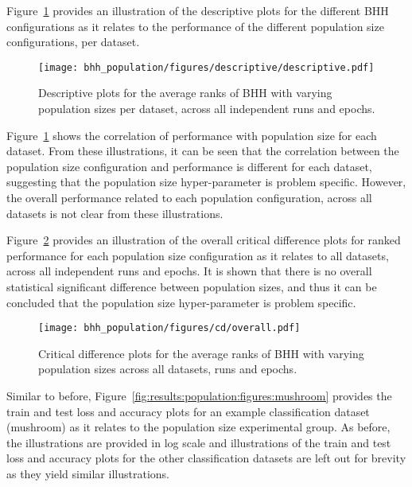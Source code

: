 Figure~\ref{fig:results:population:descriptive:descriptive} provides an illustration of the descriptive plots for the different \acs{BHH} configurations as it relates to the performance of the different population size configurations, per dataset.

\begin{figure}[htb]
      \centering
      \texttt{[image: bhh\_population/figures/descriptive/descriptive.pdf]}
      \caption{Descriptive plots for the average ranks of \acs{BHH} with varying population sizes per dataset, across all independent runs and epochs.}
      \label{fig:results:population:descriptive:descriptive}
\end{figure}

Figure~\ref{fig:results:population:descriptive:descriptive} shows the correlation of performance with population size for each dataset. From these illustrations, it can be seen that the correlation between the population size configuration and performance is different for each dataset, suggesting that the population size hyper-parameter is problem specific. However, the overall performance related to each population configuration, across all datasets is not clear from these illustrations.

Figure~\ref{fig:results:population:descriptive:cd} provides an illustration of the overall critical difference plots for ranked performance for each population size configuration as it relates to all datasets, across all independent runs and epochs. It is shown that there is no overall statistical significant difference between population sizes, and thus it can be concluded that the population size hyper-parameter is problem specific.

\begin{figure}[htb]
      \centering
      \texttt{[image: bhh\_population/figures/cd/overall.pdf]}
      \caption{Critical difference plots for the average ranks of \acs{BHH} with varying population sizes across all datasets, runs and epochs.}
      \label{fig:results:population:descriptive:cd}
\end{figure}

Similar to before, Figure~\ref{fig:results:population:figures:mushroom} provides the train and test loss and accuracy plots for an example classification dataset (mushroom) as it relates to the population size experimental group. As before, the illustrations are provided in log scale and illustrations of the train and test loss and accuracy plots for the other classification datasets are left out for brevity as they yield similar illustrations.

